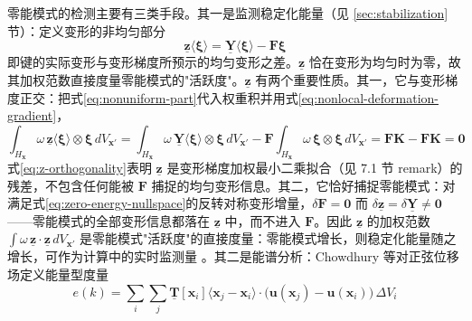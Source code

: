 零能模式的检测主要有三类手段。其一是监测稳定化能量（见 \ref{sec:stabilization}节）：定义变形的非均匀部分
\begin{equation}
  \underline{\mathbf{z}}\langle\boldsymbol{\xi}\rangle
  =\underline{\mathbf{Y}}\langle\boldsymbol{\xi}\rangle-\mathbf{F}\boldsymbol{\xi}
  \label{eq:nonuniform-part}
\end{equation}
即键的实际变形与变形梯度所预示的均匀变形之差。$\underline{\mathbf{z}}$ 恰在变形为均匀时为零，故其加权范数直接度量零能模式的"活跃度"。$\underline{\mathbf{z}}$ 有两个重要性质。其一，它与变形梯度正交：把式\eqref{eq:nonuniform-part}代入权重积并用式\eqref{eq:nonlocal-deformation-gradient}，
\begin{equation}
  \int_{H_{\mathbf{x}}}\omega\,\underline{\mathbf{z}}\langle\boldsymbol{\xi}\rangle\otimes\boldsymbol{\xi}\,dV_{\mathbf{x}'}
  =\int_{H_{\mathbf{x}}}\omega\,\underline{\mathbf{Y}}\langle\boldsymbol{\xi}\rangle\otimes\boldsymbol{\xi}\,dV_{\mathbf{x}'}
  -\mathbf{F}\int_{H_{\mathbf{x}}}\omega\,\boldsymbol{\xi}\otimes\boldsymbol{\xi}\,dV_{\mathbf{x}'}
  =\mathbf{F}\mathbf{K}-\mathbf{F}\mathbf{K}
  =\mathbf{0}
  \label{eq:z-orthogonality}
\end{equation}
式\eqref{eq:z-orthogonality}表明 $\underline{\mathbf{z}}$ 是变形梯度加权最小二乘拟合（见 7.1 节 remark）的残差，不包含任何能被 $\mathbf{F}$ 捕捉的均匀变形信息。其二，它恰好捕捉零能模式：对满足式\eqref{eq:zero-energy-nullspace}的反转对称变形增量，$\delta\mathbf{F}=\mathbf{0}$ 而 $\delta\underline{\mathbf{z}}=\delta\underline{\mathbf{Y}}\neq\mathbf{0}$——零能模式的全部变形信息都落在 $\underline{\mathbf{z}}$ 中，而不进入 $\mathbf{F}$。因此 $\underline{\mathbf{z}}$ 的加权范数 $\int\omega\,\underline{\mathbf{z}}\cdot\underline{\mathbf{z}}\,dV_{\mathbf{x}'}$ 是零能模式"活跃度"的直接度量：零能模式增长，则稳定化能量随之增长，可作为计算中的实时监测量 \cite{Silling2017}。其二是能谱分析：Chowdhury 等对正弦位移场定义能量型度量
\begin{equation}
  e(k)=\sum_{i}\sum_{j}
  \underline{\mathbf{T}}[\mathbf{x}_i]\langle\mathbf{x}_j-\mathbf{x}_i\rangle\cdot
  \bigl(\mathbf{u}(\mathbf{x}_j)-\mathbf{u}(\mathbf{x}_i)\bigr)\,\Delta V_i
  \label{eq:zero-energy-spectrum}
\end{equation}
